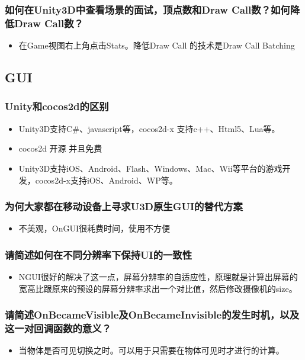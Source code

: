 \documentclass[9pt, b5paper]{article}
\begin{document}
\subsubsection{如何在Unity3D中查看场景的面试，顶点数和Draw Call数？如何降低Draw Call数？}
\label{sec:org8d81c6d}
\begin{itemize}
\item 在Game视图右上角点击Stats。降低Draw Call 的技术是Draw Call Batching
\end{itemize}


\subsection{GUI}
\label{sec:orga785ca0}
\subsubsection{Unity和cocos2d的区别}
\label{sec:orgc71a27f}
\begin{itemize}
\item Unity3D支持C\#、javascript等，cocos2d-x 支持c++、Html5、Lua等。
\item cocos2d 开源 并且免费
\item Unity3D支持iOS、Android、Flash、Windows、Mac、Wii等平台的游戏开发，cocos2d-x支持iOS、Android、WP等。
\end{itemize}
\subsubsection{为何大家都在移动设备上寻求U3D原生GUI的替代方案}
\label{sec:org6482ad0}
\begin{itemize}
\item 不美观，OnGUI很耗费时间，使用不方便
\end{itemize}
\subsubsection{请简述如何在不同分辨率下保持UI的一致性}
\label{sec:org3af75ea}
\begin{itemize}
\item NGUI很好的解决了这一点，屏幕分辨率的自适应性，原理就是计算出屏幕的宽高比跟原来的预设的屏幕分辨率求出一个对比值，然后修改摄像机的size。
\end{itemize}
\subsubsection{请简述OnBecameVisible及OnBecameInvisible的发生时机，以及这一对回调函数的意义？}
\label{sec:org72fbd21}
\begin{itemize}
\item 当物体是否可见切换之时。可以用于只需要在物体可见时才进行的计算。
\end{itemize}
\end{document}
